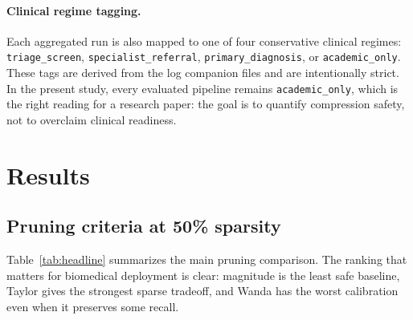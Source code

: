 \documentclass{article}
\begin{document}
\paragraph{Clinical regime tagging.}
Each aggregated run is also mapped to one of four conservative clinical regimes: \texttt{triage\_screen}, \texttt{specialist\_referral}, \texttt{primary\_diagnosis}, or \texttt{academic\_only}. These tags are derived from the log companion files and are intentionally strict. In the present study, every evaluated pipeline remains \texttt{academic\_only}, which is the right reading for a research paper: the goal is to quantify compression safety, not to overclaim clinical readiness.

\section{Results}

\subsection{Pruning criteria at 50\% sparsity}
Table~\ref{tab:headline} summarizes the main pruning comparison. The ranking that matters for biomedical deployment is clear: magnitude is the least safe baseline, Taylor gives the strongest sparse tradeoff, and Wanda has the worst calibration even when it preserves some recall.
\end{document}
